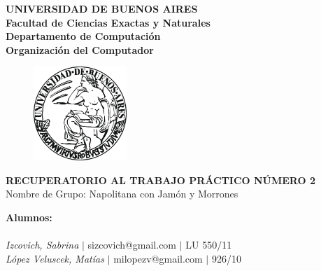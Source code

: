 \documentclass[10pt, a4paper]{article}
\begin{document}
\thispagestyle{empty}
\begin{center}

\Huge{ \bf{UNIVERSIDAD DE BUENOS AIRES}}
\\
\LARGE{\bf{Facultad de Ciencias Exactas y Naturales}}
\\
\textbf{Departamento de Computaci\'on}
\\
\textbf{Organizaci\'on del Computador}
\vspace{2.0\baselineskip}
\end{center}


\begin{figure}[h] %
\begin{center}
\includegraphics[width=100pt]{./image.jpeg}
\end{center}
\end{figure}
\begin{center}
\vspace*{0.7cm}

\huge{\bf RECUPERATORIO AL TRABAJO PR\'ACTICO N\'UMERO 2}\\
\huge{Nombre de Grupo: Napolitana con Jam\'on y Morrones}
\vspace*{8cm}

\end{center}

\huge{\textbf{Alumnos:}}\\
\\
\vspace*{0.3cm}
\Large{\textsl{Izcovich, Sabrina} $|$ sizcovich@gmail.com $|$ LU 550/11}\\
\vspace*{0.3cm}
\Large{\textsl{L\'opez Veluscek, Matías} \hspace{0.1cm}$|$ milopezv@gmail.com $|$ 926/10}\\
 
\newpage
\thispagestyle{empty}
\tableofcontents
\newpage
\end{document}
